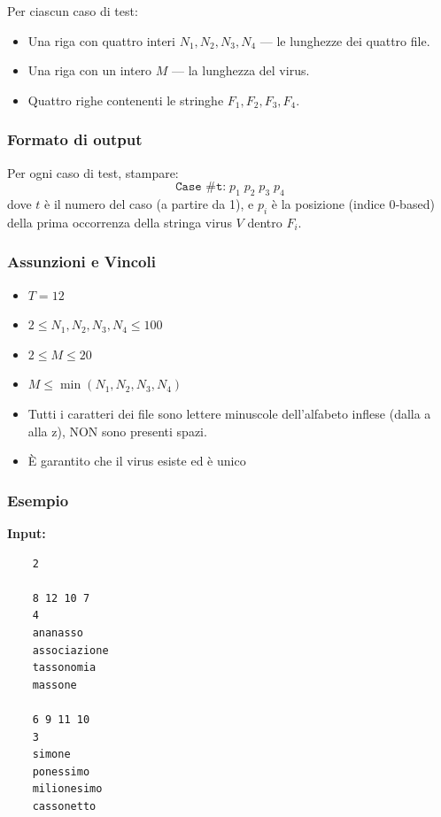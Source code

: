 Per ciascun caso di test:
\begin{itemize}
	\item Una riga con quattro interi \(N_1, N_2, N_3, N_4\) — le lunghezze dei quattro file.
	\item Una riga con un intero \(M\) — la lunghezza del virus.
	\item Quattro righe contenenti le stringhe \(F_1, F_2, F_3, F_4\).
\end{itemize}


\subsubsection*{Formato di output}  

Per ogni caso di test, stampare:
\[
\texttt{Case \#t:}\; p_1\; p_2\; p_3\; p_4
\]
dove \(t\) è il numero del caso (a partire da 1), e \(p_i\) è la posizione (indice 0‑based) della prima occorrenza della stringa virus \(V\) dentro \(F_i\).


\subsubsection*{Assunzioni e Vincoli}  


\begin{itemize}
	
\item $T = 12$

\item $2 \le N_1, N_2, N_3, N_4 \le 100$

\item $2 \le M \le 20$

\item $M \le \min(N_1, N_2, N_3, N_4)$



	\item Tutti i caratteri dei file sono lettere minuscole dell'alfabeto inflese (dalla a alla z), NON sono presenti spazi.


	\item È garantito che il virus esiste ed è unico
	
\end{itemize}




\subsubsection*{Esempio}  

\smallskip  
\textbf{Input:}  
\begin{verbatim}
	2
	
	8 12 10 7
	4
	ananasso
	associazione
	tassonomia
	massone
	
	6 9 11 10
	3
	simone
	ponessimo
	milionesimo
	cassonetto
\end{verbatim}

